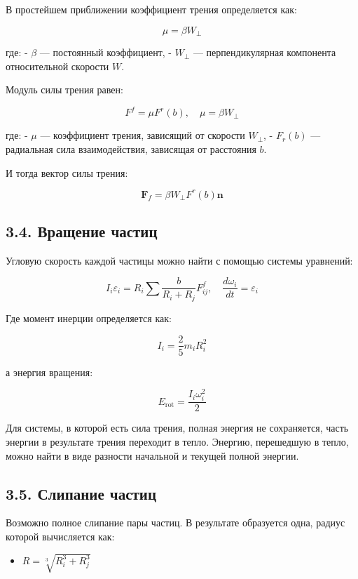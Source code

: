 \documentclass[
  english,
  russian,
  12pt,
  a4paper,
  DIV=11,
  numbers=noendperiod]{scrreprt}
\providecommand{\tightlist}{%
  \setlength{\itemsep}{0pt}\setlength{\parskip}{0pt}}
\begin{document}
В простейшем приближении коэффициент трения определяется как:

\[
\mu = \beta W_{\perp} 
\]

где: - \(\beta\) --- постоянный коэффициент, - \(W_{\perp}\) ---
перпендикулярная компонента относительной скорости \(W\).

Модуль силы трения равен:

\[
F^f = \mu F^r(b), \quad \mu = \beta W_\perp
\]

где: - \(\mu\) --- коэффициент трения, зависящий от скорости
\(W_{\perp}\), - \(F_{r}(b)\) --- радиальная сила взаимодействия,
зависящая от расстояния \(b\).

И тогда вектор силы трения:

\[
\mathbf{F}_f = \beta W_\perp F^r(b) \mathbf{n}
\]

\subsection{3.4. Вращение
частиц}\label{ux432ux440ux430ux449ux435ux43dux438ux435-ux447ux430ux441ux442ux438ux446}

Угловую скорость каждой частицы можно найти с помощью системы уравнений:

\[
I_i \varepsilon_i = R_i \sum \frac{b}{R_i + R_j} F^f_{ij}, \quad \frac{d\omega_i}{dt} = \varepsilon_i
\]

Где момент инерции определяется как:

\[
I_i = \frac{2}{5} m_i R_i^2
\]

а энергия вращения:

\[
E_{\text{rot}} = \frac{I_i \omega_i^2}{2}
\]

Для системы, в которой есть сила трения, полная энергия не сохраняется,
часть энергии в результате трения переходит в тепло. Энергию, перешедшую
в тепло, можно найти в виде разности начальной и текущей полной энергии.

\subsection{3.5. Слипание
частиц}\label{ux441ux43bux438ux43fux430ux43dux438ux435-ux447ux430ux441ux442ux438ux446}

Возможно полное слипание пары частиц. В результате образуется одна,
радиус которой вычисляется как:

\begin{itemize}
\tightlist
\item
  \(R = \sqrt[3]{R_i^3 + R_j^3}\)
\end{itemize}
\end{document}
